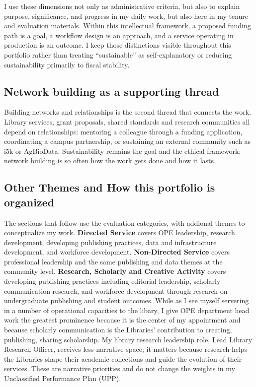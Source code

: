 I use these dimensions not only as administrative criteria, but also to explain purpose, significance, and progress in my daily work, but also here in my tenure and evaluation materials. Within this intellectual framework, a proposed funding path is a goal, a workflow design is an approach, and a service operating in production is an outcome. I keep those distinctions visible throughout this portfolio rather than treating ``sustainable'' as self-explanatory or reducing sustainability primarily to fiscal stability.

\subsection{Network building as a supporting thread}
Building networks and relationships is the second thread that connects the work. Library services, grant proposals, shared standards and research communities all depend on relationships: mentoring a colleague through a funding application, coordinating a campus partnership, or sustaining an external community such as i5k or AgBioData. Sustainability remains the goal and the ethical framework; network building is so often how the work gets done and how it lasts.

\subsection{Other Themes and How this portfolio is organized}
The sections that follow use the evaluation categories, with addional themes to conceptualize my work. \textbf{Directed Service} covers OPE leadership, research development, developing publishing practices, data and infrastructure development, and workforce development. \textbf{Non-Directed Service} covers professional leadership and the same publishing and data themes at the community level. \textbf{Research, Scholarly and Creative Activity} covers developing publishing practices including editorial leadership, scholarly communication research, and workforce development through research on undergraduate publishing and student outcomes. While as I see myself servering in a number of operational capacities to the libary, I give OPE department head work the greatest prominence because it is the center of my appointment and because scholarly communication is the Libraries' contribution to creating, publishing, sharing scholarship. My library research leadership role, Lead Library Research Officer, receives less narrative space; it matters because research helps the Libraries shape their academic collections and guide the evolution of their services. These are narrative priorities and do not change the weights in my Unclassified Performance Plan (UPP).

